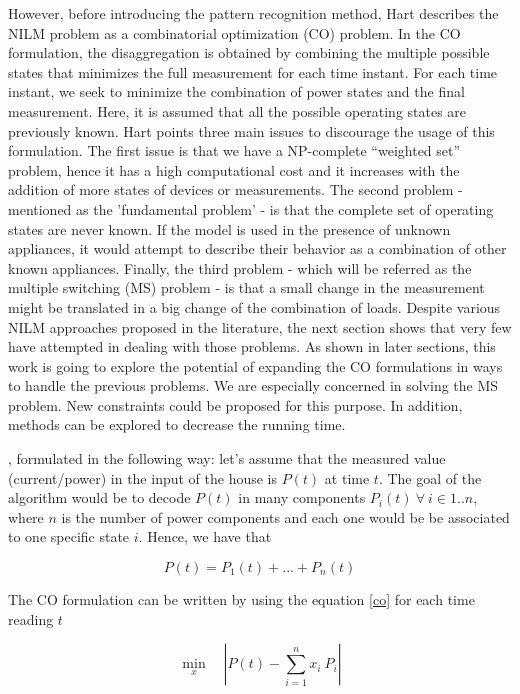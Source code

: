 However, before introducing the pattern recognition method, Hart describes the NILM problem as a combinatorial optimization (CO) problem. In the CO formulation, the disaggregation is obtained by combining the multiple possible states that minimizes the full measurement for each time instant. For each time instant, we seek to minimize the combination of power states and the final measurement. Here, it is assumed that all the possible operating states are previously known. Hart points three main issues to discourage the usage of this formulation. The first issue is that we have a NP-complete “weighted set” problem, hence it has a high computational cost and it increases with the addition of more states of devices or measurements. The second problem - mentioned as the 'fundamental problem' - is that the complete set of operating states are never known. If the model is used in the presence of unknown appliances, it would attempt to describe their behavior as a combination of other known appliances. Finally, the third problem - which will be referred as the multiple switching (MS) problem - is that a small change in the measurement might be translated in a big change of the combination of loads. Despite various NILM approaches proposed in the literature, the next section shows that very few have attempted in dealing with those problems. As shown in later sections, this work is going to explore the potential of expanding the CO formulations in ways to handle the previous problems. We are especially concerned in solving the MS problem. New constraints could be proposed for this purpose. In addition, methods can be explored to decrease the running time. 


\iffalse


, formulated in the following way: let's assume that the measured value (current/power) in the input of the house is $P(t)$ at time $t$. The goal of the algorithm would be to decode $P(t)$ in many components $P_i(t) \ \forall \ i \in 1..n$, where $n$ is the number of power components and each one would be be associated to one specific state $i$. Hence, we have that

$$P(t) = P_1(t) + ... + P_n(t)$$
 
The CO formulation can be written by using the equation \ref{co} for each time reading $t$ 

\begin{equation} \label{co}
    \min_{x} \quad \left|P(t) - \sum_{i=1}^{n} x_i\ P_i \right|
\end{equation}

